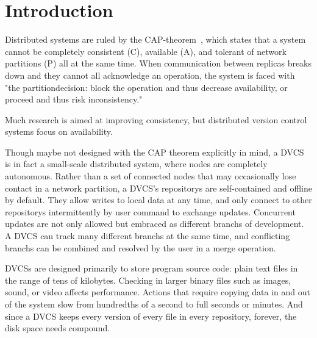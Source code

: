 \section{Introduction}


Distributed systems are ruled by the \gls{CAP-theorem}~\cite{cap_origin}, which states that a system cannot be completely consistent (C), available (A), and tolerant of network partitions (P) all at the same time.
When communication between replicas breaks down and they cannot all acknowledge an operation, the system is faced with "the \gls{partitiondecision}: block the operation and thus decrease availability, or proceed and thus risk inconsistency."~\cite{cap_years_later}

Much research is aimed at improving consistency, but distributed version control systems focus on availability.


Though maybe not designed with the CAP theorem explicitly in mind, a \gls{DVCS} is in fact a small-scale distributed system, where nodes are completely autonomous.
Rather than a set of connected nodes that may occasionally lose contact in a network partition, a \gls{DVCS}'s \glspl{repository} are self-contained and offline by default.
They allow writes to local data at any time, and only connect to other \glspl{repository} intermittently by user command to exchange updates.
Concurrent updates are not only allowed but embraced as different \glspl{branch} of development.
A \gls{DVCS} can track many different \glspl{branch} at the same time, and conflicting \glspl{branch} can be combined and resolved by the user in a \gls{merge} operation.


\Glspl{DVCS} are designed primarily to store program source code: plain text files in the range of tens of kilobytes.
Checking in larger binary files such as images, sound, or video affects performance.
Actions that require copying data in and out of the system slow from hundredths of a second to full seconds or minutes.
And since a \gls{DVCS} keeps every version of every file in every \gls{repository}, forever, the disk space needs compound.

